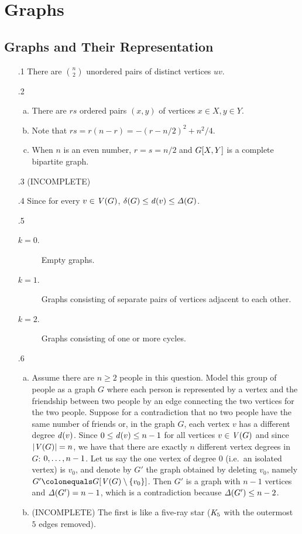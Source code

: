 \chapter{Graphs}
\section{Graphs and Their Representation}
\begin{enumerate}[1.]
%
\item[\thesection.1] There are ${n \choose 2}$ unordered pairs of distinct vertices $uv$.
%
\item[\thesection.2]
\begin{enumerate}[a)]
\item There are $rs$ ordered pairs $(x, y)$ of vertices $x \in X, y \in Y$.
\item Note that $rs = r(n - r) = -(r - n / 2)^2 + n^2 / 4$.
\item When $n$ is an even number, $r = s = n / 2$ and $G[X, Y]$ is a complete bipartite graph.
\end{enumerate}
%
\item[\thesection.3] (INCOMPLETE)
%
\item[\thesection.4] Since for every $v \in \mathit{V}(G)$, $\mathit{\delta}(G) \leq \mathit{d}(v) \leq \mathit{\Delta}(G)$.
%
\item[\thesection.5]
\begin{description}
\item[$k = 0$.] Empty graphs.
\item[$k = 1$.] Graphs consisting of separate pairs of vertices adjacent to each other.
\item[$k = 2$.] Graphs consisting of one or more cycles.
\end{description}
%
\item[\thesection.6]
\begin{enumerate}[a)]
\item Assume there are $n \geq 2$ people in this question. Model this group of people as a graph $G$ where each person is represented by a vertex and the friendship between two people by an edge connecting the two vertices for the two people. Suppose for a contradiction that no two people have the same number of friends or, in the graph $G$, each vertex $v$ has a different degree $\mathit{d}(v)$. Since $0 \leq \mathit{d}(v) \leq n - 1$ for all vertices $v \in \mathit{V}(G)$ and since $\left|\mathit{V}(G)\right| = n$, we have that there are exactly $n$ different vertex degrees in $G$: $0, \ldots, n - 1$. Let us say the one vertex of degree $0$ (i.e.~an isolated vertex) is $v_0$, and denote by $G'$ the graph obtained by deleting $v_0$, namely $G' \defas \subgraph{G}{\vset(G) \setminus \sete{v_0}}$. Then $G'$ is a graph with $n - 1$ vertices and $\mathit{\Delta}(G') = n - 1$, which is a contradiction because $\mathit{\Delta}(G') \leq n - 2$.
\item (INCOMPLETE) The first is like a five-ray star ($\clique[5]$ with the outermost $5$ edges removed).
\end{enumerate}
%
\end{enumerate}
